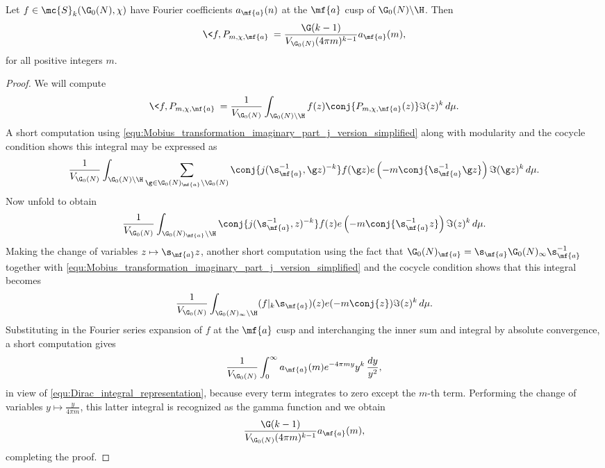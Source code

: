 \documentclass[12pt]{article}
\begin{document}
      \begin{proposition}\label{prop:Petersson_inner_product_with_Poincare_series}
        Let \(f \in \mc{S}_{k}(\G_{0}(N),\chi)\) have Fourier coefficients \(a_{\mf{a}}(n)\) at the \(\mf{a}\) cusp of \(\G_{0}(N)\backslash\H\). Then 
        \[
          \<f,P_{m,\chi,\mf{a}}\> = \frac{\G(k-1)}{V_{\G_{0}(N)}(4\pi m)^{k-1}}a_{\mf{a}}(m),
        \]
        for all positive integers \(m\).
      \end{proposition}
      \begin{proof}
        We will compute 
        \[
          \<f,P_{m,\chi,\mf{a}}\> = \frac{1}{V_{\G_{0}(N)}}\int_{\G_{0}(N)\backslash\H}f(z)\conj{P_{m,\chi,\mf{a}}(z)}\Im(z)^{k}\,d\mu.
        \]
        A short computation using \cref{equ:Mobius_transformation_imaginary_part_j_version_simplified} along with modularity and the cocycle condition shows this integral may be expressed as
        \[
          \frac{1}{V_{\G_{0}(N)}}\int_{\G_{0}(N)\backslash\H}\sum_{\g \in \G_{0}(N)_{\mf{a}}\backslash\G_{0}(N)}\conj{j(\s_{\mf{a}}^{-1},\g z)^{-k}}f(\g z)e\left(-m\conj{\s_{\mf{a}}^{-1}\g z}\right)\Im(\g z)^{k}\,d\mu.
        \]
        Now unfold to obtain
        \[
          \frac{1}{V_{\G_{0}(N)}}\int_{\G_{0}(N)_{\mf{a}}\backslash\H}\conj{j(\s_{\mf{a}}^{-1},z)^{-k}}f(z)e\left(-m\conj{\s_{\mf{a}}^{-1}z}\right)\Im(z)^{k}\,d\mu.
        \]
        Making the change of variables \(z \mapsto \s_{\mf{a}}z\), another short computation using the fact that \(\G_{0}(N)_{\mf{a}} = \s_{\mf{a}}\G_{0}(N)_{\infty}\s_{\mf{a}}^{-1}\) together with \cref{equ:Mobius_transformation_imaginary_part_j_version_simplified} and the cocycle condition shows that this integral becomes
        \[
          \frac{1}{V_{\G_{0}(N)}}\int_{\G_{0}(N)_{\infty}\backslash\H}(f|_{k}\s_{\mf{a}})(z)e(-m\conj{z})\Im(z)^{k}\,d\mu.
        \]
        Substituting in the Fourier series expansion of \(f\) at the \(\mf{a}\) cusp and interchanging the inner sum and integral by absolute convergence, a short computation gives
        \[
          \frac{1}{V_{\G_{0}(N)}}\int_{0}^{\infty}a_{\mf{a}}(m)e^{-4\pi my}y^{k}\,\frac{dy}{y^{2}},
        \]
        in view of \cref{equ:Dirac_integral_representation}, because every term integrates to zero except the \(m\)-th term. Performing the change of variables \(y \mapsto \frac{y}{4\pi m}\), this latter integral is recognized as the gamma function and we obtain
        \[
          \frac{\G(k-1)}{V_{\G_{0}(N)}(4\pi m)^{k-1}}a_{\mf{a}}(m),
        \]
        completing the proof.
      \end{proof}
 
\end{document}
